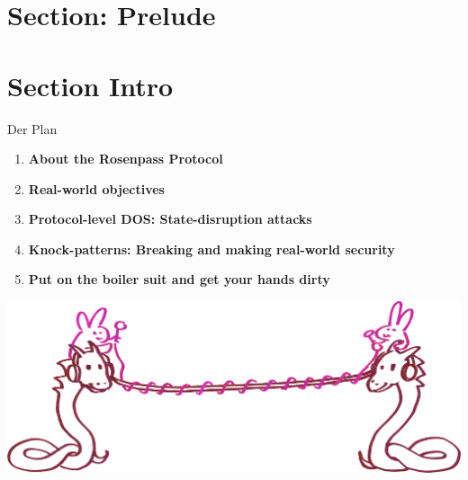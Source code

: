 \section{Section: Prelude}

\section{Section Intro}

\begin{frame}[c]{Der Plan}
  \centering
  \small

  \begin{enumerate}
    \item \textbf{About the Rosenpass Protocol}
    \item \textbf{Real-world objectives}
    \item \textbf{Protocol-level DOS: State-disruption attacks}
    \item \textbf{Knock-patterns: Breaking and making real-world security}
    \item \textbf{Put on the boiler suit and get your hands dirty}
  \end{enumerate}

  \includegraphics[height=.4\textheight]{graphics/wireguard-and-rp-bunny-rose.png}
\end{frame}

